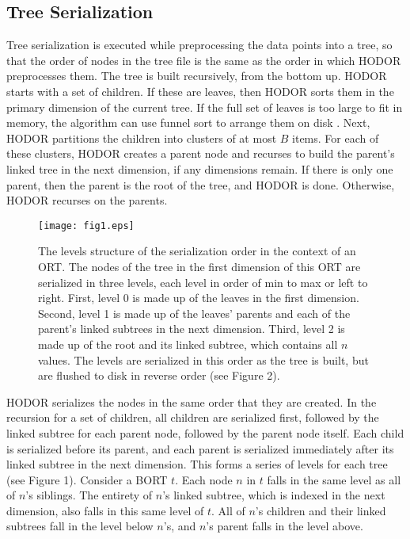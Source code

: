 \documentclass[11pt, oneside]{article}
\begin{document}
\subsection{Tree Serialization}

Tree serialization is executed while preprocessing the data points into a tree,
so that the order of nodes in the tree file is the same as the order in which
HODOR preprocesses them. The tree is built recursively, from the bottom up.
HODOR starts with a set of children. If these are leaves, then HODOR sorts them
in the primary dimension of the current tree. If the full set of leaves is too
large to fit in memory, the algorithm can use funnel sort to arrange them on
disk \cite{lecture9}. Next, HODOR partitions the children into clusters of at most $B$ items.
For each of these clusters, HODOR creates a parent node and recurses to build
the parent's linked tree in the next dimension, if any dimensions remain. If
there is only one parent, then the parent is the root of the tree, and HODOR is
done.  Otherwise, HODOR recurses on the parents.

\begin{figure}[h!]
    \centering
    \vspace{0.5in}
    \texttt{[image: fig1.eps]}
    \caption{
        The levels structure of the serialization order in the context of an
        ORT. The nodes of the tree in the first dimension of this ORT are
        serialized in three levels, each level in order of min to max or left
        to right. First, level 0 is made up of the leaves in the first
        dimension.  Second, level 1 is made up of the leaves' parents and each
        of the parent's linked subtrees in the next dimension. Third, level 2
        is made up of the root and its linked subtree, which contains all $n$
        values.  The levels are serialized in this order as the tree is built,
        but are flushed to disk in reverse order (see Figure 2).
    }
    \vspace{0.5in}
\end{figure}

HODOR serializes the nodes in the same order that they are created. In the
recursion for a set of children, all children are serialized first, followed by
the linked subtree for each parent node, followed by the parent node itself.
Each child is serialized before its parent, and each parent is serialized
immediately after its linked subtree in the next dimension. This forms a series
of levels \cite{seinfeld} for each tree (see Figure 1). Consider a BORT $t$.
Each node $n$ in $t$ falls in the same level as all of $n$'s siblings. The
entirety of $n$'s linked subtree, which is indexed in the next dimension, also
falls in this same level of $t$. All of $n$'s children and their linked subtrees
fall in the level below $n$'s, and $n$'s parent falls in the level above. 
\end{document}
